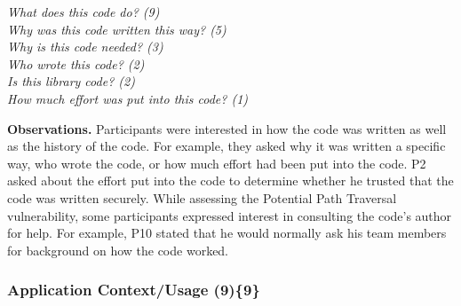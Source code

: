 \documentclass{acm_proc_article-sp}
\begin{document}
\noindent\emph{What does this code do? (9)} \\
\emph{Why was this code written this way? (5)} \\
\emph{Why is this code needed? (3)} \\
\emph{Who wrote this code? (2)} \\
\emph{Is this library code? (2)} \\
\emph{How much effort was put into this code? (1)}


\noindent\textbf{Observations.}
Participants were interested in how the code was written as well as the history of the code.
For example, they asked why it was written a specific way, who wrote the code, or how much effort had been put into the code.
P2 asked about the effort put into the code to determine whether he trusted that the code was written securely.
While assessing the Potential Path Traversal vulnerability, some participants expressed interest in consulting the code's author for help.
For example, P10 stated that he would normally ask his team members for background on how the code worked.



% 


\subsubsection{\textbf{Application Context/Usage (9)\{9\}}}\label{acu}
\end{document}
